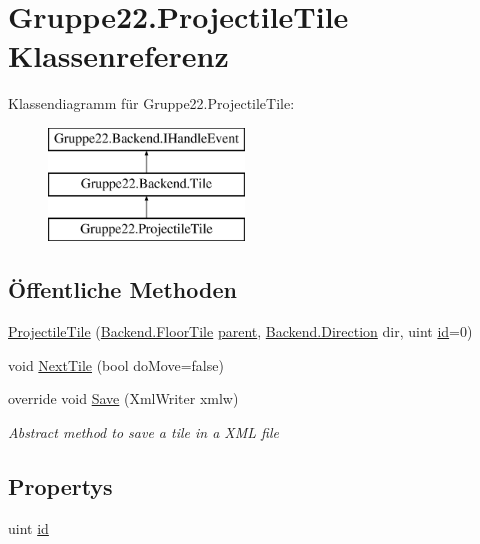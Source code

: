 \hypertarget{class_gruppe22_1_1_projectile_tile}{\section{Gruppe22.\-Projectile\-Tile Klassenreferenz}
\label{class_gruppe22_1_1_projectile_tile}
}
Klassendiagramm für Gruppe22.\-Projectile\-Tile\-:\begin{figure}[H]
\begin{center}
\leavevmode
\includegraphics[height=3.000000cm]{class_gruppe22_1_1_projectile_tile}
\end{center}
\end{figure}
\subsection*{Öffentliche Methoden}
\begin{DoxyCompactItemize}
\item 
\hyperlink{class_gruppe22_1_1_projectile_tile_ac5602e794c82c68d7bfa47af9634ee09}{Projectile\-Tile} (\hyperlink{class_gruppe22_1_1_backend_1_1_floor_tile}{Backend.\-Floor\-Tile} \hyperlink{class_gruppe22_1_1_backend_1_1_tile_abc12933c70eb3a2ebbb2fde9f45c2632}{parent}, \hyperlink{namespace_gruppe22_1_1_backend_a2d53d5d14b8ea0951ba6971e5da1ebf5}{Backend.\-Direction} dir, uint \hyperlink{class_gruppe22_1_1_projectile_tile_ab9b7a588cb5132cd66a09bef09616bb2}{id}=0)
\item 
void \hyperlink{class_gruppe22_1_1_projectile_tile_a342aab74a5f512ba72d754615134bb7a}{Next\-Tile} (bool do\-Move=false)
\item 
override void \hyperlink{class_gruppe22_1_1_projectile_tile_ac04e7d0bab385f083a1d4dca56083f3d}{Save} (Xml\-Writer xmlw)
\begin{DoxyCompactList}\small\item\em Abstract method to save a tile in a X\-M\-L file \end{DoxyCompactList}\end{DoxyCompactItemize}
\subsection*{Propertys}
\begin{DoxyCompactItemize}
\item 
uint \hyperlink{class_gruppe22_1_1_projectile_tile_ab9b7a588cb5132cd66a09bef09616bb2}{id}
\end{DoxyCompactItemize}
